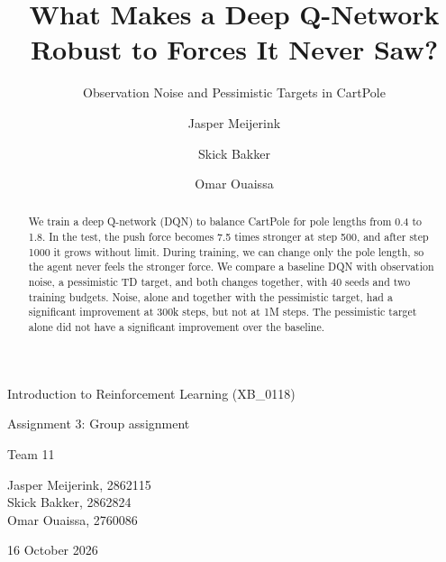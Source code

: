 \documentclass[sigconf]{acmart}
\begin{document}
\begin{titlepage}
\centering
\vspace*{4cm}
{\LARGE Introduction to Reinforcement Learning (XB\_0118)\par}
\vspace{1cm}
{\Large Assignment 3: Group assignment\par}
\vspace{1cm}
{\large Team 11\par}
\vspace{1.5cm}
{\large
Jasper Meijerink, 2862115\\[0.3cm]
Skick Bakker, 2862824\\[0.3cm]
Omar Ouaissa, 2760086\par}
\vspace{1.5cm}
{\large 16 October 2026\par}
\end{titlepage}

\title{What Makes a Deep Q-Network Robust to Forces It Never Saw?}
\subtitle{Observation Noise and Pessimistic Targets in CartPole}

\author{Jasper Meijerink}
\author{Skick Bakker}
\author{Omar Ouaissa}

\begin{abstract}
We train a deep Q-network (DQN) to balance CartPole for pole lengths from 0.4 to 1.8. In the test, the push force becomes 7.5 times stronger at step 500, and after step 1000 it grows without limit. During training, we can change only the pole length, so the agent never feels the stronger force. We compare a baseline DQN with observation noise, a pessimistic TD target, and both changes together, with 40 seeds and two training budgets. Noise, alone and together with the pessimistic target, had a significant improvement at 300k steps, but not at 1M steps. The pessimistic target alone did not have a significant improvement over the baseline.
\end{abstract}


\maketitle
\pagestyle{plain} %
\end{document}
